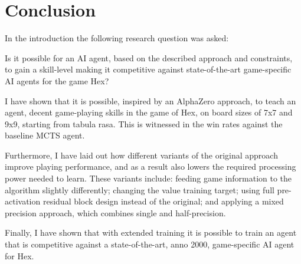 \chapter{Conclusion}
In the introduction the following research question was asked:

\begin{displayquote}
Is it possible for an AI agent, based on the described approach and constraints, to gain a skill-level making it competitive against state-of-the-art game-specific AI agents for the game Hex?
\end{displayquote}

I have shown that it is possible, inspired by an AlphaZero approach, to teach an agent, decent game-playing skills in the game of Hex, on board sizes of 7x7 and 9x9, starting from tabula rasa. This is witnessed in the win rates against the baseline MCTS agent. 

Furthermore, I have laid out how different variants of the original approach improve playing performance, and as a result also lowers the required processing power needed to learn. These variants include: feeding game information to the algorithm slightly differently; changing the value training target; using full pre-activation residual block design instead of the original; and applying a mixed precision approach, which combines single and half-precision.

Finally, I have shown that with extended training it is possible to train an agent that is competitive against a state-of-the-art, anno 2000, game-specific AI agent for Hex.